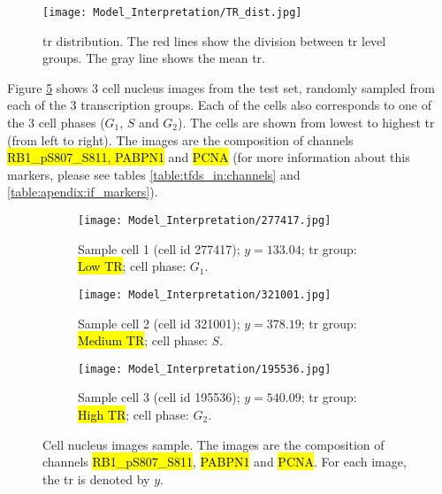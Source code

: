 \begin{figure}[!h]
  \centering
  \texttt{[image: Model\_Interpretation/TR\_dist.jpg]}
  \caption{\gls{tr} distribution. The red lines show the division between \gls{tr} level groups. The gray line shows the mean \gls{tr}.}
  \label{fig:results:model_int:tr_dist}
\end{figure}

Figure \ref{fig:results:model_inter_cell_samp} shows 3 cell nucleus images from the test set, randomly sampled from each of the 3 transcription groups. Each of the cells also corresponds to one of the 3 cell phases ($G_1$, $S$ and $G_2$).
The cells are shown from lowest to highest \gls{tr} (from left to right).
The images are the composition of channels \hl{RB1\_pS807\_S811, PABPN1} and \hl{PCNA} (for more information about this markers, please see tables \ref{table:tfds_in:channels} and \ref{table:apendix:if_markers}).

\begin{figure}[!h]
  \centering
  \begin{subfigure}[b]{.3\linewidth}
    \texttt{[image: Model\_Interpretation/277417.jpg]}
    \caption{Sample cell 1 (cell id 277417); $y=133.04$; \gls{tr} group: \hl{Low TR}; cell phase: $G_1$.}
    \label{fig:results:model_inter_cell_samp:cell_1}
  \end{subfigure}
  \begin{subfigure}[b]{.3\linewidth}
    \texttt{[image: Model\_Interpretation/321001.jpg]}
    \caption{Sample cell 2 (cell id 321001); $y=378.19$; \gls{tr} group: \hl{Medium TR}; cell phase: $S$.}
    \label{fig:results:model_inter_cell_samp:cell_2}
  \end{subfigure}
  \begin{subfigure}[b]{.3\linewidth}
    \texttt{[image: Model\_Interpretation/195536.jpg]}
    \caption{Sample cell 3 (cell id 195536); $y=540.09$; \gls{tr} group: \hl{High TR}; cell phase: $G_2$.}
    \label{fig:results:model_inter_cell_samp:cell_3}
  \end{subfigure}
  \caption{Cell nucleus images sample. The images are the composition of channels \hl{RB1\_pS807\_S811}, \hl{PABPN1} and \hl{PCNA}. For each image, the \gls{tr} is denoted by $y$.}
  \label{fig:results:model_inter_cell_samp}
\end{figure}
